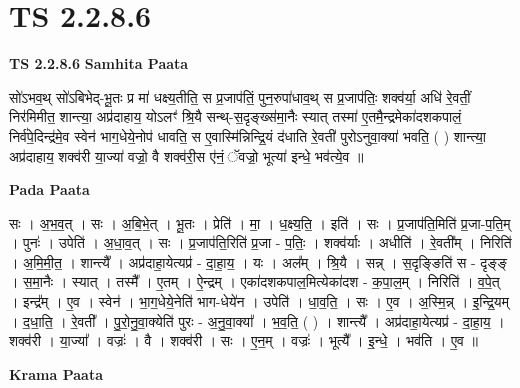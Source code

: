 \documentclass[17pt]{extarticle}
\begin{document}
\section*{ TS 2.2.8.6 }

\textbf{TS 2.2.8.6 } \newline
\textbf{Samhita Paata} \newline

सो॑ऽभव॒थ् सो॑ऽबिभेद्-भू॒तः प्र मा॑ धक्ष्य॒तीति॒ स प्र॒जाप॑तिं॒ पुन॒रुपा॑धाव॒थ् स प्र॒जाप॑तिः॒ शक्व॑र्या॒ अधि॑ रे॒वतीं॒ निर॑मिमीत॒ शान्त्या॒ अप्र॑दाहाय॒ योऽलꣳ॑ श्रि॒यै सन्थ्-स॒दृङ्ख्स॑मा॒नैः स्यात् तस्मा॑ ए॒तमै॒न्द्रमेका॑दशकपालं॒ निर्व॑पे॒दिन्द्र॑मे॒व स्वेन॑ भाग॒धेये॒नोप॑ धावति॒ स ए॒वास्मि॑न्निन्द्रि॒यं द॑धाति रे॒वती॑ पुरोऽनुवा॒क्या॑ भवति॒ ( ) शान्त्या॒ अप्र॑दाहाय॒ शक्व॑री या॒ज्या॑ वज्रो॒ वै शक्व॑री॒स ए॑नं॒ ॅवज्रो॒ भूत्या॑ इन्धे॒ भव॑त्ये॒व ॥ \newline

\textbf{Pada Paata} \newline

सः । अ॒भ॒व॒त् । सः । अ॒बि॒भे॒त् । भू॒तः । प्रेति॑ । मा॒ । ध॒क्ष्य॒ति॒ । इति॑ । सः । प्र॒जाप॑ति॒मिति॑ प्र॒जा-प॒ति॒म् । पुनः॑ । उपेति॑ । अ॒धा॒व॒त् । सः । प्र॒जाप॑ति॒रिति॑ प्र॒जा - प॒तिः॒ । शक्व॑र्याः । अधीति॑ । रे॒वती᳚म् । निरिति॑ । अ॒मि॒मी॒त॒ । शान्त्यै᳚ । अप्र॑दाहा॒येत्यप्र॑ - दा॒हा॒य॒ । यः । अल᳚म् । श्रि॒यै । सन्न् । स॒दृङ्ङिति॑ स - दृङ्ङ् । स॒मा॒नैः । स्यात् । तस्मै᳚ । ए॒तम् । ऐ॒न्द्रम् । एका॑दशकपाल॒मित्येका॑दश - क॒पा॒ल॒म् । निरिति॑ । व॒पे॒त् । इन्द्र᳚म् । ए॒व । स्वेन॑ । भा॒ग॒धेये॒नेति॑ भाग-धेये॑न । उपेति॑ । धा॒व॒ति॒ । सः । ए॒व । अ॒स्मि॒न्न् । इ॒न्द्रि॒यम् । द॒धा॒ति॒ । रे॒वती᳚ । पु॒रो॒नु॒वा॒क्येति॑ पुरः - अ॒नु॒वा॒क्या᳚ । भ॒व॒ति॒ ( ) । शान्त्यै᳚ । अप्र॑दाहा॒येत्यप्र॑ - दा॒हा॒य॒ । शक्व॑री । या॒ज्या᳚ । वज्रः॑ । वै । शक्व॑री । सः । ए॒न॒म् । वज्रः॑ । भूत्यै᳚ । इ॒न्धे॒ । भव॑ति । ए॒व ॥  \newline


\textbf{Krama Paata} \newline
\end{document}

